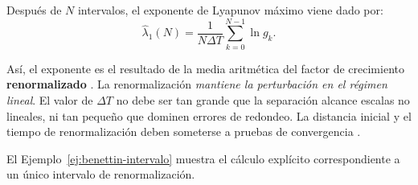 \documentclass[12pt,a4paper,oneside]{report}
\theoremstyle{definition}
\numberwithin{equation}{chapter}
\begin{document}
Después de \(N\) intervalos, el exponente de Lyapunov máximo viene dado por:
\begin{equation}
    \boxed{ \widehat{\lambda}_1(N)= \frac{1}{N\Delta T} \sum_{k=0}^{N-1}\ln g_k.}
    \label{eq:benettin-max}
\end{equation}

Así, el exponente es el resultado de la media aritmética del factor de crecimiento \textbf{renormalizado} \cite{benettin1980}. La renormalización \textit{mantiene la perturbación en el régimen lineal}. El valor de \(\Delta T\) no debe ser tan grande que la separación alcance escalas no lineales, ni tan pequeño que dominen errores de redondeo. La distancia inicial y el tiempo de renormalización deben someterse a pruebas de convergencia \cite{dubeibe2014}.

El Ejemplo~\ref{ej:benettin-intervalo} muestra el cálculo explícito correspondiente a un único intervalo de renormalización.
\end{document}

